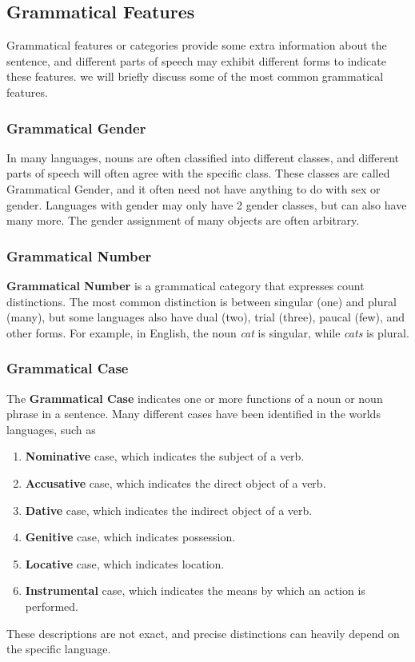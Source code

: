 \subsection{Grammatical Features}
Grammatical features or categories provide some extra information about the sentence, and different parts of speech may exhibit different forms
to indicate these features. we will briefly discuss some of the most common grammatical features.

\subsubsection{Grammatical Gender}
In many languages, nouns are often classified into different classes, and different parts of speech will often agree with the specific class. These classes
are called Grammatical Gender, and it often need not have anything to do with sex or gender. Languages with gender may only have 2 gender classes, but can also
have many more. The gender assignment of many objects are often arbitrary. 

\subsubsection{Grammatical Number}
\textbf{Grammatical Number} is a grammatical category that expresses count distinctions. The most common distinction is between singular (one) and plural (many), but
some languages also have dual (two), trial (three), paucal (few), and other forms. For example, in English, the noun \textit{cat} is singular, while \textit{cats} is plural.

\subsubsection{Grammatical Case}
The \textbf{Grammatical Case} indicates one or more functions of a noun or noun phrase in a sentence. Many different cases have been identified in the worlds languages, such as

\begin{enumerate}
    \item \textbf{Nominative} case, which indicates the subject of a verb.
    \item \textbf{Accusative} case, which indicates the direct object of a verb.
    \item \textbf{Dative} case, which indicates the indirect object of a verb.
    \item \textbf{Genitive} case, which indicates possession.
    \item \textbf{Locative} case, which indicates location.
    \item \textbf{Instrumental} case, which indicates the means by which an action is performed.
\end{enumerate}
These descriptions are not exact, and precise distinctions can heavily depend on the specific language.

